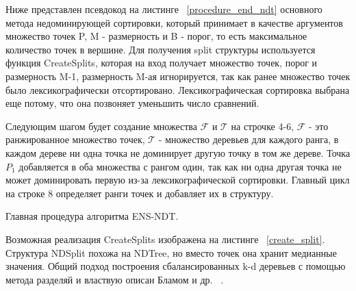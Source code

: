 Ниже представлен псевдокод на листинге ~\ref{procedure_end_ndt} основного метода недоминирующей сортировки, который принимает в качестве аргументов множество точек P, M - размерность и B - порог, то есть максимальное количество точек в вершине. Для получения split структуры используется функция CreateSplits, которая на вход получает множество точек, порог и размерность M-1, размерность M-ая игнорируется, так как ранее множество точек было лексикографически отсортировано. Лексикографическая сортировка выбрана еще потому, что она позвоняет уменьшить число сравнений.

Следующим шагом будет создание множества $\mathcal{F}$ и $\mathcal{T}$ на строчке 4-6, $\mathcal{F}$ - это ранжированное множество точек, $\mathcal{T}$ - множество деревьев для каждого ранга, в каждом дереве ни одна точка не доминирует другую точку в том же дереве. Точка $P_1$ добавляется в оба множества с рангом один, так как ни одна другая точка не может доминировать первую из-за лексикографической сортировки. Главный цикл на строке 8 определяет ранги точек и добавляет их в структуру.

\begin{algorithm}
\begin{algorithmic}[1]
            \EndIf
        \EndIf
    \EndFor
\EndProcedure
\end{algorithmic}
\caption{Главная процедура алгоритма ENS-NDT.}
\label{procedure_end_ndt}
\end{algorithm}

Возможная реализация CreateSplits изображена на листинге ~\ref{create_split}. Структура NDSplit похожа на NDTree, но вместо точек она хранит медианные значения. Общий подход построения сбалансированных k-d деревьев с помощью метода разделяй и властвую описан Бламом и др. ~\cite{Blum}.

